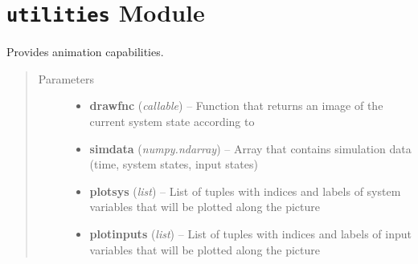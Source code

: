 \documentclass[letterpaper,10pt,english]{sphinxmanual}
\begin{document}
\section{\texttt{utilities} Module}
\label{pytrajectory:module-pytrajectory.utilities}\label{pytrajectory:utilities-module}

\begin{fulllineitems}
\label{pytrajectory:pytrajectory.utilities.Animation}
Provides animation capabilities.
\begin{quote}\begin{description}
\item[{Parameters}] \leavevmode\begin{itemize}
\item {} 
\textbf{drawfnc} (\emph{callable}) -- Function that returns an image of the current system state according to 

\item {} 
\textbf{simdata} (\emph{numpy.ndarray}) -- Array that contains simulation data (time, system states, input states)

\item {} 
\textbf{plotsys} (\emph{list}) -- List of tuples with indices and labels of system variables that will be plotted along the picture

\item {} 
\textbf{plotinputs} (\emph{list}) -- List of tuples with indices and labels of input variables that will be plotted along the picture

\end{itemize}

\end{description}\end{quote}

\begin{fulllineitems}
\label{pytrajectory:pytrajectory.utilities.Animation.Image}~

\begin{fulllineitems}
\label{pytrajectory:pytrajectory.utilities.Animation.Image.reset}
\end{fulllineitems}



\end{fulllineitems}
\end{fulllineitems}
\end{document}
